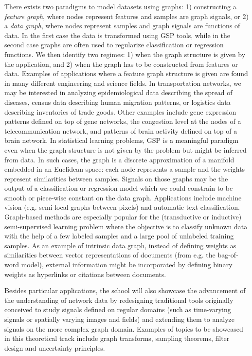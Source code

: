 \documentclass[a4paper]{scrartcl}
\begin{document}
There exists two paradigms to model datasets using graphs: 1) constructing a
\textit{feature graph}, where nodes represent features and samples are graph
signals, or 2) a \textit{data graph}, where nodes represent samples and graph
signals are functions of data. In the first case the data is transformed using
GSP tools, while in the second case graphs are often used to regularize
classification or regression functions.  We then identify two regimes: 1) when
the graph structure is given by the application, and 2) when the graph has to be
constructed from features or data.
Examples of applications where a feature graph structure is given are found in
many different engineering and science fields. In transportation networks, we
may be interested in analyzing epidemiological data describing the spread of
diseases, census data describing human migration patterns, or logistics data
describing inventories of trade goods. Other examples include gene expression
patterns defined on top of gene networks, the congestion level at the nodes of a
telecommunication network, and patterns of brain activity defined on top of a
brain network.
In statistical learning problems, GSP is a meaningful paradigm even when the
graph structure is not given by the problem but might be inferred from data.  In
such cases, the graph is a discrete approximation of a manifold embedded in an
Euclidean space: each node represents a sample and the weights represent
similarities between samples. Signals on those graphs may be the output of a
classification or regression model which we could constrain to be smooth or
piece-wise constant on the data graph. Applications include machine vision (e.g.
semi-local graphs between pixels) and automatic text classification.
Graph-based methods are especially popular for the (transductive or inductive)
semi-supervised learning problem where the objective is to classify unknown data
with the help of a few labeled samples and a large pool of unlabeled training
samples.
As an example of intrinsic data graph, instead of defining weights as
similarities between vector representations of documents (from e.g. the
bag-of-word model), external information might be incorporated by defining
binary weights as hyperlinks or citations between documents.

Besides particular applications, the school will also showcase the advancement
of the understanding of network data by redesigning traditional tools originally
conceived to study signals defined on regular domains (such as time-varying
signals or spatially varying images and fields) and extending them to analyze
signals on the more complex graph domain. Examples of topics to be showcased in
this theoretical track include graph transforms, sampling theorems, filter
design and uncertainty principles.
\end{document}
